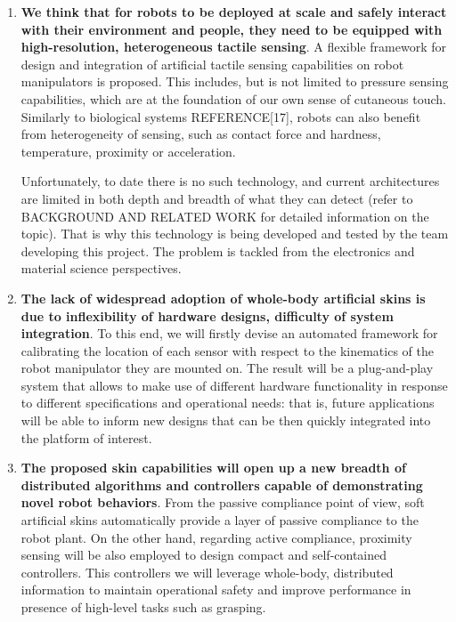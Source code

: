 \begin{enumerate}
    \item \textbf{We think that for robots to be deployed at scale and safely interact with their environment and people, they need to be equipped with high-resolution, heterogeneous tactile sensing}. A flexible framework for design and integration of artificial tactile sensing capabilities on robot manipulators is proposed. This includes, but is not limited to pressure sensing capabilities, which are at the foundation of our own sense of cutaneous touch. Similarly to biological systems REFERENCE[17], robots can also benefit from heterogeneity of sensing, such as contact force and hardness, temperature, proximity or acceleration.

    Unfortunately, to date there is no such technology, and current architectures are limited in both depth and breadth of what they can detect (refer to BACKGROUND AND RELATED WORK for detailed information on the topic). That is why this technology is being developed and tested by the team developing this project. The problem is tackled from the electronics and material science perspectives.

    \item \textbf{The lack of widespread adoption of whole-body artificial skins is due to inflexibility of hardware designs, difficulty of system integration}. To this end, we will firstly devise an automated framework for calibrating the location of each sensor with respect to the kinematics of the robot manipulator they are mounted on. The result will be a plug-and-play system that allows to make use of different hardware functionality in response to different specifications and operational needs: that is, future applications will be able to inform new designs that can be then quickly integrated into the platform of interest.

    \item \textbf{The proposed skin capabilities will open up a new breadth of distributed algorithms and controllers capable of demonstrating novel robot behaviors}. From the passive compliance point of view, soft artificial skins automatically provide a layer of passive compliance to the robot plant. On the other hand, regarding active compliance, proximity sensing will be also employed to design compact and self-contained controllers. This controllers we will leverage whole-body, distributed information to maintain operational safety and improve performance in presence of high-level tasks such as grasping.


\end{enumerate}
